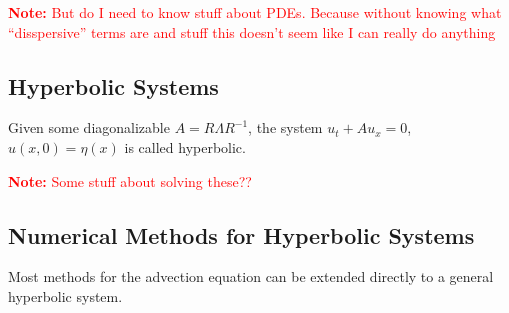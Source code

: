 \documentclass[12pt]{article}
\newcommand{\note}[1]{\textcolor{red}{\textbf{Note:} #1}}
\begin{document}
\note{But do I need to know stuff about PDEs. Because without knowing what ``disspersive'' terms are and stuff this doesn't seem like I can really do anything}

\subsection{Hyperbolic Systems}
Given some diagonalizable \( A = R\Lambda R^{-1} \), the system \( u_t + Au_x = 0 \), \( u(x,0) = \eta(x) \) is called hyperbolic.

\note{Some stuff about solving these??}

\subsection{Numerical Methods for Hyperbolic Systems}
Most methods for the advection equation can be extended directly to a general hyperbolic system.








\end{document}
